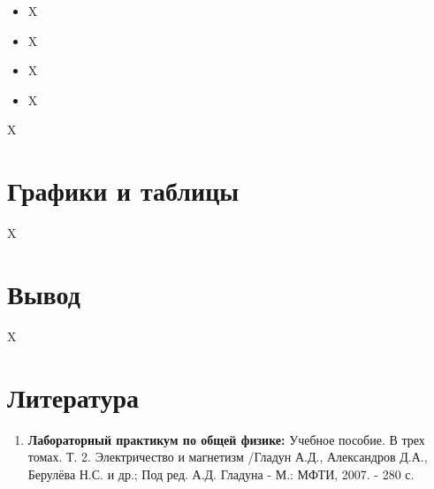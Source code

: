 \documentclass[a4paper, 12pt]{article}%
\begin{document}
\begin{itemize}
\begin{center}
\end{center}

\item X

\item X

\item X

\item X

\end{itemize}

X

\section{Графики и таблицы}

X

\section{Вывод}

X

\section{Литература}

\begin{enumerate}
\item \textbf{Лабораторный практикум по общей физике:} Учебное пособие. В трех томах. Т. 2. Электричество и магнетизм /Гладун А.Д., Александров Д.А., Берулёва Н.С. и др.; Под ред. А.Д. Гладуна - М.: МФТИ, 2007. - 280 с.
\end{enumerate}		
		
					
\end{document}
